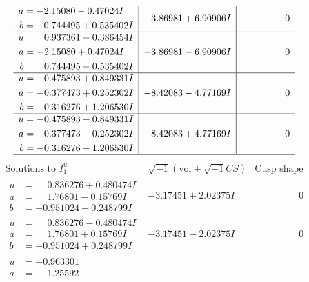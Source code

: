 \documentclass[1p]{elsarticle_modified}
\theoremstyle{definition}
\newcommand{\I}{\sqrt{-1}}
\begin{document}
$$\begin{array}{c|c|c}
\begin{aligned}
a &= -2.15080 - 0.47024 I \\
b &= \phantom{-}0.744495 + 0.535402 I\end{aligned}
 & -3.86981 + 6.90906 I & \phantom{-0.000000 } 0 \\ \hline\begin{aligned}
u &= \phantom{-}0.937361 - 0.386454 I \\
a &= -2.15080 + 0.47024 I \\
b &= \phantom{-}0.744495 - 0.535402 I\end{aligned}
 & -3.86981 - 6.90906 I & \phantom{-0.000000 } 0 \\ \hline\begin{aligned}
u &= -0.475893 + 0.849331 I \\
a &= -0.377473 + 0.252302 I \\
b &= -0.316276 + 1.206530 I\end{aligned}
 & -8.42083 - 4.77169 I & \phantom{-0.000000 } 0 \\ \hline\begin{aligned}
u &= -0.475893 - 0.849331 I \\
a &= -0.377473 - 0.252302 I \\
b &= -0.316276 - 1.206530 I\end{aligned}
 & -8.42083 + 4.77169 I & \phantom{-0.000000 } 0\\
 \hline 
 \end{array}$$\newpage$$\begin{array}{c|c|c}  
\text{Solutions to }I^u_{1}& \I (\text{vol} + \sqrt{-1}CS) & \text{Cusp shape}\\
 \hline 
\begin{aligned}
u &= \phantom{-}0.836276 + 0.480474 I \\
a &= \phantom{-}1.76801 - 0.15769 I \\
b &= -0.951024 - 0.248799 I\end{aligned}
 & -3.17451 + 2.02375 I & \phantom{-0.000000 } 0 \\ \hline\begin{aligned}
u &= \phantom{-}0.836276 - 0.480474 I \\
a &= \phantom{-}1.76801 + 0.15769 I \\
b &= -0.951024 + 0.248799 I\end{aligned}
 & -3.17451 - 2.02375 I & \phantom{-0.000000 } 0 \\ \hline\begin{aligned}
u &= -0.963301\phantom{ +0.000000I} \\
a &= \phantom{-}1.25592\phantom{ +0.000000I} \\

\end{aligned}
\end{array}$$
\end{document}
